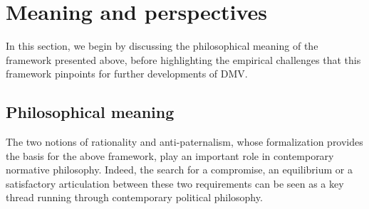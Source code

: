 \documentclass[version=3.21, pagesize, twoside=off, bibliography=totoc, DIV=calc, fontsize=12pt, a4paper, french, english]{scrartcl}
\begin{document}

\section{Meaning and perspectives}
\label{disc}
In this section, we begin by discussing the philosophical meaning of the framework presented above, before highlighting the empirical challenges that this framework pinpoints for further developments of \ac{DMV}.

\subsection{Philosophical meaning}
The two notions of rationality and anti-paternalism, whose formalization provides the basis for the above framework, play an important role in contemporary normative philosophy. 
Indeed, the search for a compromise, an equilibrium or a satisfactory articulation between these two requirements can be seen as a key thread running through contemporary political philosophy.
\end{document}
